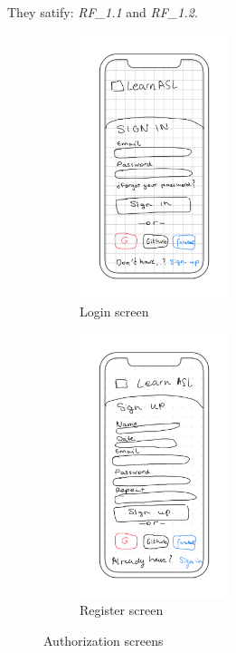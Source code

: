They satify: \textit{RF\_1.1} and \textit{RF\_1.2}. \\
\begin{figure}[H]
    \centering
    \begin{subfigure}[T]{0.49\textwidth}
        \centering
        \includegraphics[width=0.48\textwidth]{assets/screens/auth/Login.png}
        \caption{Login screen}
        \label{fig:design_screen_login}
    \end{subfigure}
    \hfill
    \begin{subfigure}[T]{0.49\textwidth}
        \centering
        \includegraphics[width=0.48\textwidth]{assets/screens/auth/Register.png}
        \caption{Register screen}
        \label{fig:design_screen_camera_register}
    \end{subfigure}
       \caption{Authorization screens}
       \label{fig:design_screens_auth}
\end{figure}

